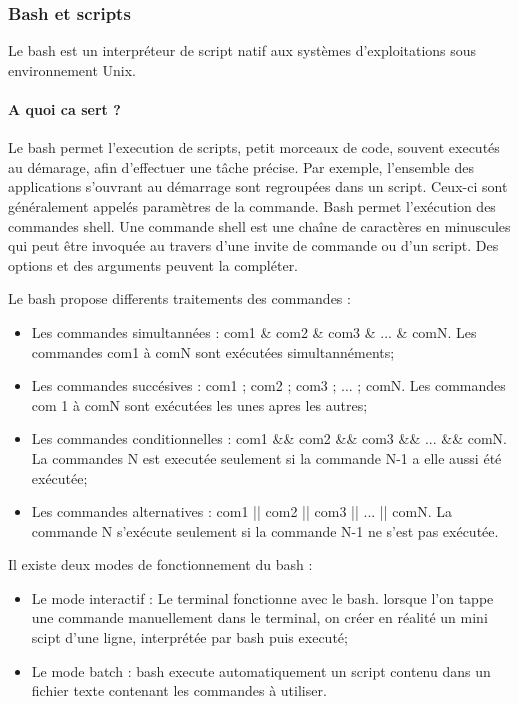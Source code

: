 \subsubsection{Bash et scripts}

Le bash est un interpréteur de script natif aux systèmes d'exploitations sous environnement Unix.


\paragraph{A quoi ca sert ?}

Le bash permet l'execution de scripts, petit morceaux de code, souvent executés au démarage, afin d'effectuer une tâche précise. Par exemple, l'ensemble des applications s'ouvrant au démarrage sont regroupées dans un script. Ceux-ci sont généralement appelés paramètres de la commande. Bash permet l'exécution des commandes shell. Une commande shell est une chaîne de caractères en minuscules qui peut être invoquée au travers d'une invite de commande ou d'un script. Des options et des arguments peuvent la compléter.

Le bash propose differents traitements des commandes :
\begin{itemize}
  \item Les commandes simultannées : com1 \& com2 \& com3 \& ... \& comN. Les commandes com1 à comN sont exécutées simultannéments;
  \item Les commandes succésives : com1 ; com2 ; com3 ; ... ; comN. Les commandes com 1 à comN sont exécutées les unes apres les autres;
  \item Les commandes conditionnelles : com1 \&\& com2 \&\& com3 \&\& ... \&\& comN. La commandes N est executée seulement si la commande N-1 a elle aussi été exécutée;
  \item Les commandes alternatives : com1 || com2 || com3 || ... || comN. La commande N s'exécute seulement si la commande N-1 ne s'est pas exécutée.
\end{itemize}

Il existe deux modes de fonctionnement du bash :
\begin{itemize}
  \item Le mode interactif : Le terminal fonctionne avec le bash. lorsque l'on tappe une commande manuellement dans le terminal, on créer en réalité un mini scipt d'une ligne, interprétée par bash puis executé;
  \item Le mode batch : bash execute automatiquement un script contenu dans un fichier texte contenant les commandes à utiliser.
\end{itemize}


